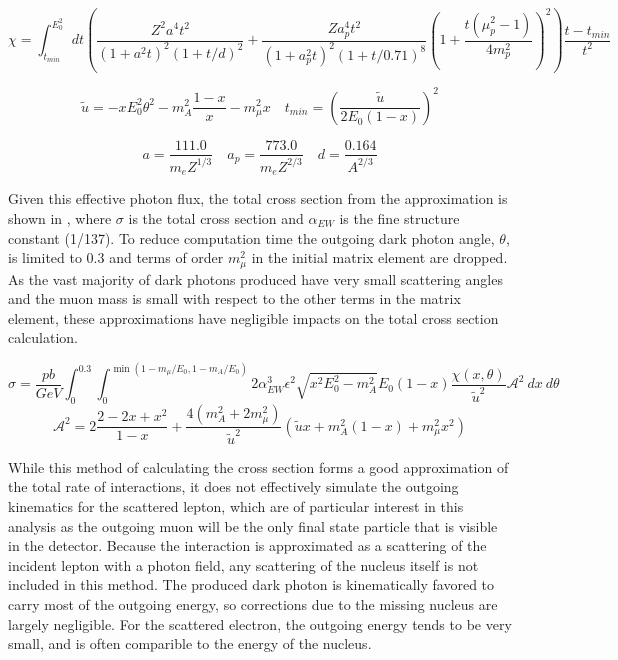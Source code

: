\begin{equation}
	\label{eq:chi}
	\chi = \int^{E_0^2}_{t_{min}} dt \left( \frac{Z^2a^4t^2}{(1+a^2t)^2(1+t/d)^2}+\frac{Za_p^4t^2}{(1+a_p^2t)^2(1+t/0.71)^8}\left(1+\frac{t(\mu_p^2-1)}{4m_p^2}\right)^2\right)\frac{t-t_{min}}{t^2}
\end{equation}

\begin{equation}
	\label{eq:utilde}
	\tilde{u} = -xE_0^2\theta^2 - m_A^2\frac{1-x}{x} - m_\mu^2x
	\quad
	t_{min} = \left(\frac{\tilde{u}}{2E_0(1-x)}\right)^2
\end{equation}

\begin{equation}
	\label{eq:adefs}
	a = \frac{111.0}{m_e Z^{1/3}}
	\quad
	a_p = \frac{773.0}{m_e Z^{2/3}}
	\quad
	d = \frac{0.164}{A^{2/3}}
\end{equation}

Given this effective photon flux, the total cross section from the \ww approximation is shown in  \cite{Bjorken_2009}, where $\sigma$ is the total cross section and $\alpha_{EW}$ is the fine structure constant (1/137).
To reduce computation time the outgoing dark photon angle, $\theta$, is limited to 0.3 and terms of order $m_\mu^2$ in the initial matrix element are dropped.
As the vast majority of dark photons produced have very small scattering angles and the muon mass is small with respect to the other terms in the matrix element, these approximations have negligible impacts on the total cross section calculation.

\begin{equation}
	\label{eq:fullCX}
        \sigma = \frac{pb}{GeV} \int_0^{0.3} \int_0^{\min(1-m_\mu/E_0,1-m_A/E_0)} 2 \alpha_{EW}^3\epsilon^2 \sqrt{x^2E_0^2 - m_A^2}E_0(1-x) 
	    \frac{\chi(x,\theta)}{\tilde{u}^2} \mathcal{A}^2
~dx~d\theta
\end{equation}
\begin{equation}
	\label{eq:afunc}
	\mathcal{A}^2 = 2\frac{2-2x+x^2}{1-x}+\frac{4(m_A^2+2m_\mu^2)}{\tilde{u}^2}(\tilde{u}x + m_A^2(1-x) + m_\mu^2x^2)
\end{equation}

While this method of calculating the cross section forms a good approximation of the total rate of \dbrem interactions, it does not effectively simulate the outgoing kinematics for the scattered lepton, which are of particular interest in this analysis as the outgoing muon will be the only final state particle that is visible in the detector.
Because the interaction is approximated as a scattering of the incident lepton with a photon field, any scattering of the nucleus itself is not included in this method.
The produced dark photon is kinematically favored to carry most of the outgoing energy, so corrections due to the missing nucleus are largely negligible.
For the scattered electron, the outgoing energy tends to be very small, and is often comparible to the energy of the nucleus.

